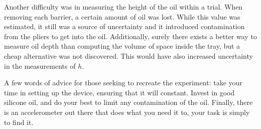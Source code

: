Another difficulty was in measuring the height of the oil within a trial. When removing each barrier, a certain amount of oil was lost. While this value was estimated, it still was a source of uncertainty and it introduced contamination from the pliers to get into the oil. Additionally, surely there exists a better way to measure oil depth than computing the volume of space inside the tray, but a cheap alternative was not discovered. This would have also increased uncertainty in the measurements of $h$. 

A few words of advice for those seeking to recreate the experiment: take your time in setting up the device, ensuring that it will constant. Invest in good silicone oil, and do your best to limit any contamination of the oil. Finally, there is an accelerometer out there that does what you need it to, your task is simply to find it. 